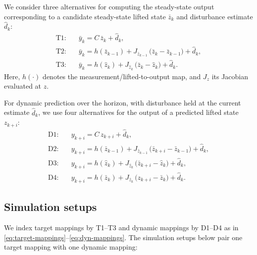 \documentclass[preprint,12pt,authoryear]{elsarticle}
\begin{document}
We consider three alternatives for computing the steady-state output corresponding to a candidate steady-state lifted state \(\bar z_k\) and disturbance estimate \(\hat d_k\):
\begin{subequations}
  \label{eq:target-mappings}
  \begin{align}
    \text{T1:}\quad & \bar y_k = C\,\bar z_k + \hat d_k, \\[-0.2em]
    \text{T2:}\quad & \bar y_k = h\!\left(\bar z_{k-1}\right) + J_{\bar z_{k-1}}\,\big(\bar z_k - \bar z_{k-1}\big) + \hat d_k, \\[-0.2em]
    \text{T3:}\quad & \bar y_k = h\!\left(\hat z_k\right) + J_{\hat z_k}\,\big(\bar z_k - \hat z_k\big) + \hat d_k.
  \end{align}
\end{subequations}
Here, \(h(\cdot)\) denotes the measurement/lifted-to-output map, and \(J_{z}\) its Jacobian evaluated at \(z\).

For dynamic prediction over the horizon, with disturbance held at the current estimate \(\hat d_k\), we use four alternatives for the output of a predicted lifted state \(z_{k+i}\):
\begin{subequations}
  \label{eq:dyn-mappings}
  \begin{align}
    \text{D1:}\quad & y_{k+i} = C\, z_{k+i} + \hat d_k, \\[-0.2em]
    \text{D2:}\quad & y_{k+i} = h\!\left(\bar z_{k-1}\right) + J_{\bar z_{k-1}}\,\big(\bar z_{k+i} - \bar z_{k-1}\big) + \hat d_k, \\[-0.2em]
    \text{D3:}\quad & y_{k+i} = h\!\left(\hat z_k\right) + J_{\hat z_k}\,\big(\bar z_{k+i} - \hat z_k\big) + \hat d_k, \\[-0.2em]
    \text{D4:}\quad & y_{k+i} = h\!\left(\bar z_k\right) + J_{\bar z_k}\,\big( z_{k+i} - \bar z_k\big) + \hat d_k.
  \end{align}
\end{subequations}

\subsection{Simulation setups}

We index target mappings by T1--T3 and dynamic mappings by D1--D4 as in \eqref{eq:target-mappings}--\eqref{eq:dyn-mappings}. The simulation setups below pair one target mapping with one dynamic mapping:
\end{document}
